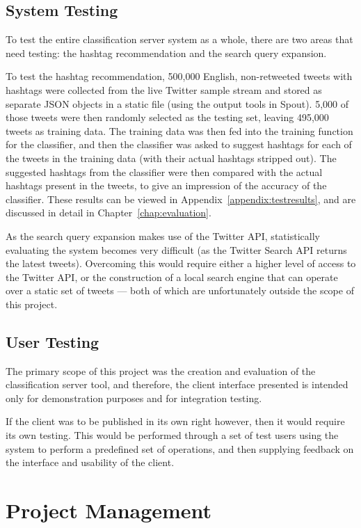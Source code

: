 \documentclass[11pt,a4paper]{report}
\begin{document}
\section{System Testing}
\label{sec:systemtesting}
To test the entire classification server system as a whole, there are two areas that need testing: the hashtag recommendation and the search query expansion.

To test the hashtag recommendation, 500,000 English, non-retweeted tweets with hashtags were collected from the live Twitter sample stream and stored as separate JSON objects in a static file (using the output tools in Spout). 5,000 of those tweets were then randomly selected as the testing set, leaving 495,000 tweets as training data. The training data was then fed into the training function for the classifier, and then the classifier was asked to suggest hashtags for each of the tweets in the training data (with their actual hashtags stripped out). The suggested hashtags from the classifier were then compared with the actual hashtags present in the tweets, to give an impression of the accuracy of the classifier. These results can be viewed in Appendix~\ref{appendix:testresults}, and are discussed in detail in Chapter~\ref{chap:evaluation}.

As the search query expansion makes use of the Twitter API, statistically evaluating the system becomes very difficult (as the Twitter Search API returns the latest tweets). Overcoming this would require either a higher level of access to the Twitter API, or the construction of a local search engine that can operate over a static set of tweets --- both of which are unfortunately outside the scope of this project.

\section{User Testing}
The primary scope of this project was the creation and evaluation of the classification server tool, and therefore, the client interface presented is intended only for demonstration purposes and for integration testing.

If the client was to be published in its own right however, then it would require its own testing. This would be performed through a set of test users using the system to perform a predefined set of operations, and then supplying feedback on the interface and usability of the client.

\pagebreak

\chapter{Project Management}
\label{chap:projmanagement}
\end{document}
